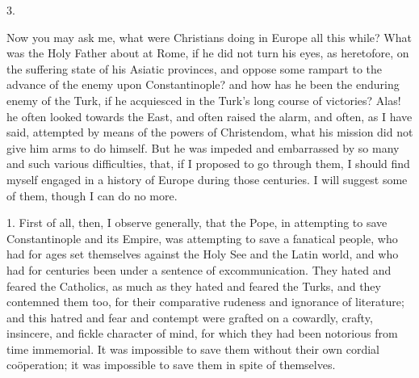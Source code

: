3.

Now you may ask me, what were
Christians doing in Europe all this while? What was the Holy Father
about at Rome, if he did not turn his eyes, as heretofore, on the
suffering state of his Asiatic provinces, and oppose some rampart to
the advance of the enemy upon Constantinople? and how has he been the
enduring enemy of the Turk, if he acquiesced in the Turk's long course
of victories? Alas! he often looked towards the East, and often raised
the alarm, and often, as I have said, attempted by means of the powers
of Christendom, what his mission did not give him arms to do himself.
But he was impeded and embarrassed by so many and such various
difficulties, that, if I proposed to go through them, I should find
myself engaged in a history of Europe during those centuries. I will
suggest some of them, though I can do no more.

1. First of all, then, I
observe generally, that the Pope, in attempting to save Constantinople
and its Empire, was attempting to save a fanatical people, who had for ages set themselves against the Holy See and the Latin world,
and who had for centuries been under a sentence of excommunication.
They hated and feared the Catholics, as much as they hated and feared
the Turks, and they contemned them too, for their comparative rudeness
and ignorance of literature; and this hatred and fear and contempt
were grafted on a cowardly, crafty, insincere, and fickle character of
mind, for which they had been notorious from time immemorial. It was
impossible to save them without their own cordial coöperation; it was
impossible to save them in spite of themselves.

